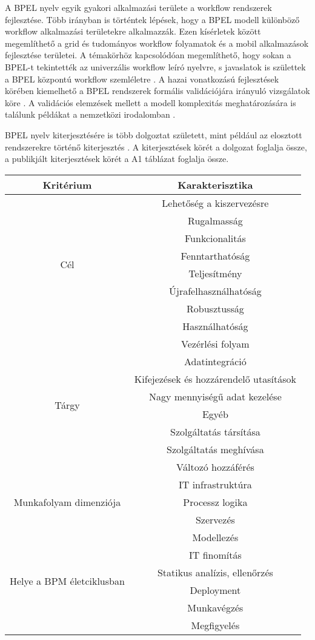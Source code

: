 A BPEL nyelv egyik gyakori alkalmazási területe a workflow rendszerek fejlesztése. Több irányban is történtek lépések, hogy  a BPEL  modell különböző workflow alkalmazási területekre alkalmazzák. Ezen kísérletek között megemlíthető a grid és tudományos  workflow folyamatok \cite{slominski2007adapting} és a mobil alkalmazások fejlesztése \cite{hackmann2006sliver} területei.  A témakörhöz kapcsolódóan megemlíthető, hogy sokan a BPEL-t tekintették az univerzális workflow leíró nyelvre, s javaslatok is születtek a BPEL központú workflow szemléletre \cite{van2008translating}. A  hazai vonatkozású fejlesztések körében kiemelhető a BPEL rendszerek formális validációjára irányuló vizsgálatok köre \cite{kovacs2008formal}. A validációs elemzések mellett a modell komplexitás meghatározására is találunk példákat a nemzetközi irodalomban  \cite{cardoso2007complexity}. 

BPEL  nyelv kiterjesztésére is több dolgoztat született, mint például az elosztott rendszerekre történő kiterjesztés \cite{baresi2007towards}. A kiterjesztések körét a \cite{kopp2011classification} dolgozat foglalja össze, a publikjált kiterjesztések körét a A1 táblázat foglalja össze.
\begin{center}
\begin{tabular}{|c|c|}
\hline
\textbf{Kritérium} & \textbf{Karakterisztika}\\
\hline
\multirow{8}{7em}{Cél} & Lehetőség a kiszervezésre\\
& Rugalmasság\\
& Funkcionalitás\\
& Fenntarthatóság\\
& Teljesítmény\\
& Újrafelhasználhatóság\\
& Robusztusság\\
& Használhatóság\\
\hline
\multirow{8}{7em}{Tárgy} & Vezérlési folyam\\
& Adatintegráció\\
& Kifejezések és hozzárendelő utasítások\\
& Nagy mennyiségű adat kezelése\\
& Egyéb \\
& Szolgáltatás társítása\\
& Szolgáltatás meghívása\\
& Változó hozzáférés\\
\hline
\multirow{3}{7em}{Munkafolyam dimenziója} & IT infrastruktúra\\
& Processz logika\\
& Szervezés\\
\hline
\multirow{6}{7em}{Helye a BPM életciklusban} & Modellezés\\
& IT finomítás\\
& Statikus analízis, ellenőrzés\\
& Deployment\\
& Munkavégzés\\
& Megfigyelés\\
\hline
\end{tabular}
\end{center}

